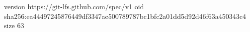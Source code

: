 version https://git-lfs.github.com/spec/v1
oid sha256:ea44497245876449df3347ac500789787bc1bfc2a01dd5d92d46f63a450343c4
size 63
